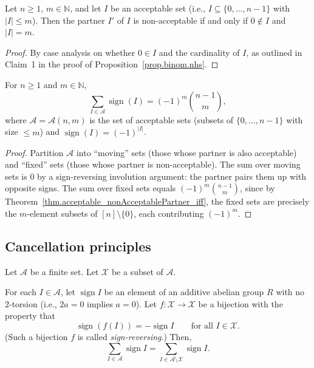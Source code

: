\begin{theorem}
\label{thm.acceptable_nonAcceptablePartner_iff}
\leanhelper
\leanok
Let $n \geq 1$, $m \in \mathbb{N}$, and let $I$ be an acceptable set
(i.e., $I \subseteq \{0, \ldots, n-1\}$ with $|I| \leq m$). Then the
partner $I'$ of $I$ is non-acceptable if and only if $0 \notin I$
and $|I| = m$.
\end{theorem}

\begin{proof}
\leanok
By case analysis on whether $0 \in I$ and the
cardinality of $I$, as outlined in Claim~1 in the proof of
Proposition~\ref{prop.binom.nhs}.
\end{proof}

\begin{theorem}
\label{thm.sum_signs_acceptable}
\leanhelper
\leanok
For $n \geq 1$ and $m \in \mathbb{N}$,
\[
\sum_{I \in \mathcal{A}} \operatorname{sign}(I)
= (-1)^m \binom{n-1}{m},
\]
where $\mathcal{A} = \mathcal{A}(n, m)$ is the set of acceptable sets
(subsets of $\{0, \ldots, n-1\}$ with size $\leq m$) and
$\operatorname{sign}(I) = (-1)^{|I|}$.
\end{theorem}

\begin{proof}
Partition $\mathcal{A}$ into ``moving'' sets (those whose partner is
also acceptable) and ``fixed'' sets (those whose partner is
non-acceptable). The sum over moving sets is $0$ by a sign-reversing
involution argument: the partner pairs them up with opposite signs.
The sum over fixed sets equals $(-1)^m \binom{n-1}{m}$, since by
Theorem~\ref{thm.acceptable_nonAcceptablePartner_iff}, the fixed sets
are precisely the $m$-element subsets of $[n] \setminus \{0\}$, each
contributing $(-1)^m$.
\end{proof}

\subsection{Cancellation principles}

\begin{lemma}
\label{lem.sign.cancel1}
\leantarget
\leanok
Let $\mathcal{A}$ be a finite set. Let $\mathcal{X}$ be a subset of
$\mathcal{A}$.

For each $I \in \mathcal{A}$, let $\operatorname{sign} I$ be an element
of an additive abelian group $R$ with no $2$-torsion (i.e., $2a = 0$
implies $a = 0$). Let $f : \mathcal{X} \to \mathcal{X}$ be a bijection
with the property that
\[
\operatorname{sign}(f(I)) = -\operatorname{sign} I
\qquad \text{for all } I \in \mathcal{X}.
\]
(Such a bijection $f$ is called \emph{sign-reversing}.) Then,
\[
\sum_{I \in \mathcal{A}} \operatorname{sign} I
= \sum_{I \in \mathcal{A} \setminus \mathcal{X}} \operatorname{sign} I.
\]
\end{lemma}

